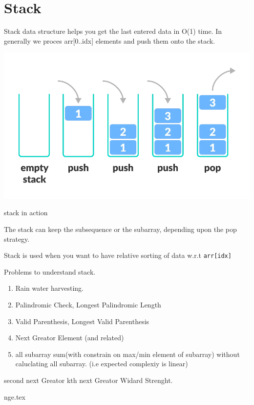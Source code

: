 \chapter{Stack}\label{chp:stack}

Stack data structure helps you get the last entered data in O(1) time.
In generally we proces arr[0..idx] elements and push them onto the stack.

\begin{marginfigure}  
\includegraphics[width=\marginparwidth]{./resources/stack_intro.png}
\caption{stack in action}
\end{marginfigure}

The stack can keep the subsequence or the subarray, depending upon the pop strategy.

Stack is used when you want to have relative sorting of data w.r.t \verb|arr[idx]|

Problems to understand stack.
\begin{exercise}
    \begin{enumerate}
        \item Rain water harvesting.
        \item Palindromic Check, Longest Palindromic Length
        \item Valid Parenthesis, Longest Valid Parenthesis
        \item Next Greator Element (and related)
        \item all subarray sum(with constrain on max/min element of subarray) without caluclating all subarray. (i.e expected complexiy is linear)
    \end{enumerate}
\end{exercise}

second next Greator
kth next Greator
Widard Strenght.


{nge.tex}
